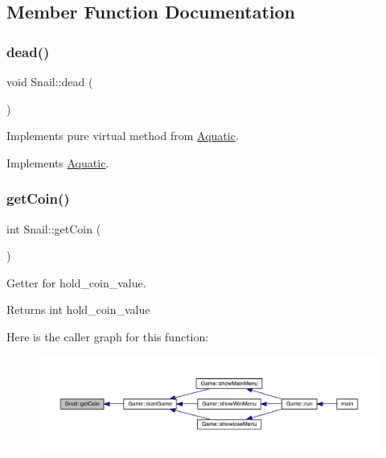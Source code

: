 \subsection{Member Function Documentation}
\mbox{\label{class_snail_ae80c3d27739aefd6d9c9078c4d17fcc3}} 
\subsubsection{\texorpdfstring{dead()}{dead()}}
{\footnotesize\ttfamily void Snail\+::dead (\begin{DoxyParamCaption}{ }\end{DoxyParamCaption})\hspace{0.3cm}{\ttfamily [virtual]}}



Implements pure virtual method from \mbox{\hyperlink{class_aquatic}{Aquatic}}. 



Implements \mbox{\hyperlink{class_aquatic_a22fdb11e9cfec922fe50638709768276}{Aquatic}}.

\mbox{\label{class_snail_a78405d7cca0e430a3adf51a8461fff68}} 
\subsubsection{\texorpdfstring{get\+Coin()}{getCoin()}}
{\footnotesize\ttfamily int Snail\+::get\+Coin (\begin{DoxyParamCaption}{ }\end{DoxyParamCaption})}



Getter for hold\+\_\+coin\+\_\+value. 

\begin{DoxyReturn}{Returns}
int hold\+\_\+coin\+\_\+value 
\end{DoxyReturn}
Here is the caller graph for this function\+:
\nopagebreak
\begin{figure}[H]
\begin{center}
\leavevmode
\includegraphics[width=350pt]{class_snail_a78405d7cca0e430a3adf51a8461fff68_icgraph}
\end{center}
\end{figure}
\mbox{\label{class_snail_af5892ec122d9199480c813b74488256b}} 
